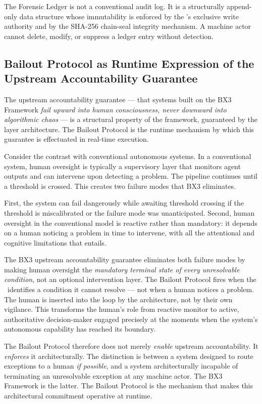 The Forensic Ledger is not a conventional audit log. It is a structurally append-only data structure whose immutability is enforced by the \fact's exclusive write authority and by the SHA-256 chain-seal integrity mechanism. A machine actor cannot delete, modify, or suppress a ledger entry without detection.

\subsection{Bailout Protocol as Runtime Expression of the Upstream Accountability Guarantee}
\label{sec:runtime-expression}

The upstream accountability guarantee --- that systems built on the BX3 Framework \textit{fail upward into human consciousness, never downward into algorithmic chaos} --- is a structural property of the framework, guaranteed by the layer architecture. The Bailout Protocol is the runtime mechanism by which this guarantee is effectuated in real-time execution.

Consider the contrast with conventional autonomous systems. In a conventional system, human oversight is typically a supervisory layer that monitors agent outputs and can intervene upon detecting a problem. The pipeline continues until a threshold is crossed. This creates two failure modes that BX3 eliminates.

First, the system can fail dangerously while awaiting threshold crossing if the threshold is miscalibrated or the failure mode was unanticipated. Second, human oversight in the conventional model is reactive rather than mandatory: it depends on a human noticing a problem in time to intervene, with all the attentional and cognitive limitations that entails.

The BX3 upstream accountability guarantee eliminates both failure modes by making human oversight the \textit{mandatory terminal state of every unresolvable condition}, not an optional intervention layer. The Bailout Protocol fires when the \bounds\ identifies a condition it cannot resolve --- not when a human notices a problem. The human is inserted into the loop by the architecture, not by their own vigilance. This transforms the human's role from reactive monitor to active, authoritative decision-maker engaged precisely at the moments when the system's autonomous capability has reached its boundary.

The Bailout Protocol therefore does not merely \textit{enable} upstream accountability. It \textit{enforces} it architecturally. The distinction is between a system designed to route exceptions to a human \textit{if possible}, and a system architecturally incapable of terminating an unresolvable exception at any machine actor. The BX3 Framework is the latter. The Bailout Protocol is the mechanism that makes this architectural commitment operative at runtime.

